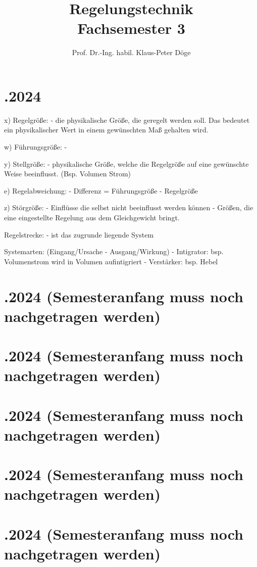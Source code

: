\documentclass{article}
\title{Regelungstechnik  \\ [1ex] \large Fachsemester 3}
\author{Prof. Dr.-Ing. habil. Klaus-Peter Döge}
\date{}
\begin{document}
\maketitle


\newpage
 \section*{.2024}

  x) Regelgröße:
  - die physikalische Größe, die geregelt werden soll. Das bedeutet ein physikalischer Wert in einem gewünschten Maß gehalten wird.

  w) Führungsgröße:
  -

  y) Stellgröße:
  - physikalische Größe, welche die Regelgröße auf eine gewünschte Weise beeinflusst. (Bsp. Volumen Strom)

  e) Regelabweichung:
  - Differenz = Führungsgröße - Regelgröße

  z) Störgröße:
  - Einflüsse die selbst nicht beeinflusst werden können
  - Größen, die eine eingestellte Regelung aus dem Gleichgewicht bringt.

  Regelstrecke:
  - ist das zugrunde liegende System

  Systemarten: (Eingang/Ursache - Ausgang/Wirkung)
  - Intigrator: bsp. Volumenstrom wird in Volumen aufintigriert
  - Verstärker: bsp. Hebel


\newpage
\section*{.2024 (Semesteranfang muss noch nachgetragen werden)}
\section*{.2024 (Semesteranfang muss noch nachgetragen werden)}
\section*{.2024 (Semesteranfang muss noch nachgetragen werden)}
\section*{.2024 (Semesteranfang muss noch nachgetragen werden)}
\section*{.2024 (Semesteranfang muss noch nachgetragen werden)}
\end{document}
